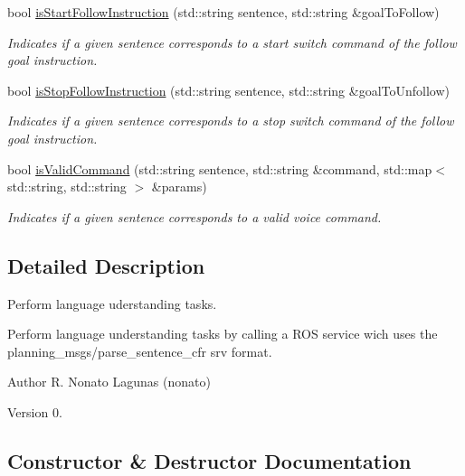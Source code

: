 \begin{DoxyCompactItemize}
bool \hyperlink{class_lang_understanding_tasks_a095f138989fbc7d139272a82490c3361}{is\+Start\+Follow\+Instruction} (std\+::string sentence, std\+::string \&goal\+To\+Follow)
\begin{DoxyCompactList}\small\item\em Indicates if a given sentence corresponds to a start switch command of the follow goal instruction. \end{DoxyCompactList}\item 
bool \hyperlink{class_lang_understanding_tasks_acab2b17e01d5eb7b89440659abeb62ad}{is\+Stop\+Follow\+Instruction} (std\+::string sentence, std\+::string \&goal\+To\+Unfollow)
\begin{DoxyCompactList}\small\item\em Indicates if a given sentence corresponds to a stop switch command of the follow goal instruction. \end{DoxyCompactList}\item 
bool \hyperlink{class_lang_understanding_tasks_aaa6e78154e3bd9a9ac9bd9f243cea8ce}{is\+Valid\+Command} (std\+::string sentence, std\+::string \&command, std\+::map$<$ std\+::string, std\+::string $>$ \&params)
\begin{DoxyCompactList}\small\item\em Indicates if a given sentence corresponds to a valid voice command. \end{DoxyCompactList}\end{DoxyCompactItemize}


\subsection{Detailed Description}
Perform language uderstanding tasks. 

Perform language understanding tasks by calling a R\+OS service wich uses the planning\+\_\+msgs/parse\+\_\+sentence\+\_\+cfr srv format.

\begin{DoxyAuthor}{Author}
R. Nonato Lagunas (nonato) 
\end{DoxyAuthor}
\begin{DoxyVersion}{Version}
0. 
\end{DoxyVersion}


\subsection{Constructor \& Destructor Documentation}
